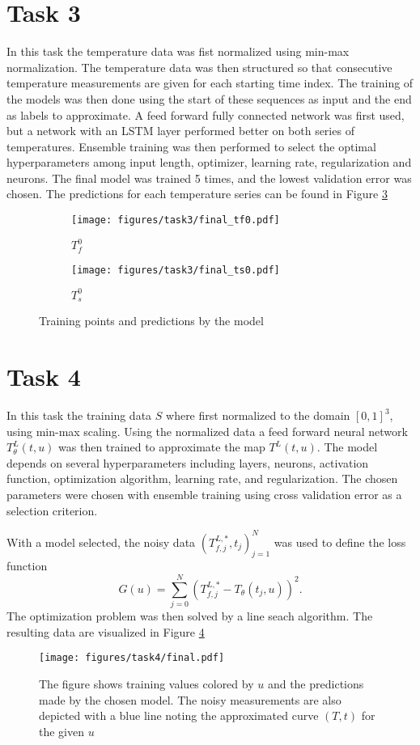 \documentclass[a4paper]{article}
\begin{document}
\section*{Task 3}
In this task the temperature data was fist normalized using min-max normalization. The temperature data was then structured so that consecutive temperature measurements are given for each starting time index. The training of the models was then done using the start of these sequences as input and the end as labels to approximate. A feed forward fully connected network was first used, but a network with an LSTM layer performed better on both series of temperatures. Ensemble training was then performed to select the optimal hyperparameters among input length, optimizer, learning rate, regularization and neurons. The final model was trained 5 times, and the lowest validation error was chosen. The predictions for each temperature series can be found in Figure \ref{fig:task3}
\begin{figure}[t]
  \begin{subfigure}[b]{0.5\textwidth}
    \centering
    \texttt{[image: figures/task3/final\_tf0.pdf]}
    \caption{$T_f^0$}
    \label{fig:task3a}
  \end{subfigure}
  \begin{subfigure}[b]{0.5\textwidth}
    \centering
    \texttt{[image: figures/task3/final\_ts0.pdf]}
    \caption{$T_s^0$}
    \label{fig:task3b}
  \end{subfigure}
  \caption{Training points and predictions by the model}
  \label{fig:task3}
\end{figure}

\section*{Task 4}
In this task the training data $S$ where first normalized to the domain $[0,1]^3$, using min-max scaling. Using the normalized data a feed forward neural network $T^L_{\theta}(t, u)$ was then trained to approximate the map $T^L(t, u)$. The model depends on several hyperparameters including layers, neurons, activation function, optimization algorithm, learning rate, and regularization. The chosen parameters were chosen with ensemble training using cross validation error as a selection criterion.

With a model selected, the noisy data $(T_{f,j}^{L,*}, t_j)_{j=1}^{N}$ was used to define the loss function
\begin{equation}
  G(u) = \sum_{j=0}^{N}{(T_{f,j}^{L,*} - T_{\theta}(t_j,u))^2}.
\end{equation}
The optimization problem was then solved by a line seach algorithm. The resulting data are visualized in Figure \ref{fig:task4}
\begin{figure}[t]
    \centering
    \texttt{[image: figures/task4/final.pdf]}
    \caption{The figure shows training values colored by $u$ and the predictions made by the chosen model. The noisy measurements are also depicted with a blue line noting the approximated curve $(T,t)$ for the given $u$}
    \label{fig:task4}
\end{figure}
\end{document}
